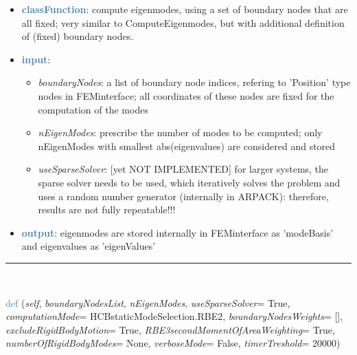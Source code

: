 \begin{itemize}[leftmargin=1.4cm]
\begin{itemize}[leftmargin=1.4cm]
\begin{itemize}[leftmargin=1.4cm]
\begin{itemize}[leftmargin=0.5cm]
\begin{itemize}[leftmargin=1.4cm]
\begin{itemize}[leftmargin=1.4cm]
\begin{itemize}[leftmargin=1.4cm]
\begin{itemize}[leftmargin=0.5cm]
\begin{flushleft}
\end{flushleft}
\setlength{\itemindent}{0.7cm}
\begin{itemize}[leftmargin=0.7cm]
\item[--]\textcolor{steelblue}{\bf classFunction}: compute eigenmodes, using a set of boundary nodes that are all fixed; very similar to ComputeEigenmodes, but with additional definition of (fixed) boundary nodes.
\item[--]\textcolor{steelblue}{\bf input}: \vspace{-6pt}
\begin{itemize}[leftmargin=1.2cm]
\setlength{\itemindent}{-0.7cm}
\item[]{\it boundaryNodes}: a list of boundary node indices, refering to 'Position' type nodes in FEMinterface; all coordinates of these nodes are fixed for the computation of the modes
\item[]{\it nEigenModes}: prescribe the number of modes to be computed; only nEigenModes with smallest abs(eigenvalues) are considered and stored
\item[]{\it useSparseSolver}: [yet NOT IMPLEMENTED] for larger systems, the sparse solver needs to be used, which iteratively solves the problem and uses a random number generator (internally in ARPACK): therefore, results are not fully repeatable!!!
\end{itemize}
\item[--]\textcolor{steelblue}{\bf output}: eigenmodes are stored internally in FEMinterface as 'modeBasis' and eigenvalues as 'eigenValues'
\vspace{12pt}\end{itemize}
%
\noindent\rule{8cm}{0.75pt}\vspace{1pt} \\ 
\begin{flushleft}
\noindent \textcolor{steelblue}{def {\bf {}}}\label{sec:FEM:FEMinterface:ComputeHurtyCraigBamptonModes}
({\it self}, {\it boundaryNodesList}, {\it nEigenModes}, {\it useSparseSolver}= True, {\it computationMode}= HCBstaticModeSelection.RBE2, {\it boundaryNodesWeights}= [], {\it excludeRigidBodyMotion}= True, {\it RBE3secondMomentOfAreaWeighting}= True, {\it numberOfRigidBodyModes}= None, {\it verboseMode}= False, {\it timerTreshold}= 20000)
\end{flushleft}
\setlength{\itemindent}{0.7cm}
\begin{itemize}[leftmargin=0.7cm]

\end{itemize}
\end{itemize}
\end{itemize}
\end{itemize}
\end{itemize}
\end{itemize}
\end{itemize}
\end{itemize}
\end{itemize}
